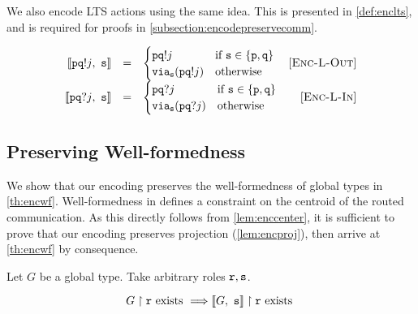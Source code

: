 We also encode LTS actions using the same idea. 
This is presented in \cref{def:enclts}, and is required for
proofs in \cref{subsection:encodepreservecomm}.

\begin{definition}

\doublespacing
\[
\begin{array}{rclr}
\llbracket {  {\mathtt{p}}  {\mathtt{q}} !{j} },~{\mathtt{s}} \rrbracket &= & \begin{cases}
{\mathtt{p}}{\mathtt{q}}!{j}
	& \text{if } {\mathtt{s}} \in \{ {\mathtt{p}}, {\mathtt{q}} \} \\
{\texttt{via}_{{\mathtt{s}}}({{\mathtt{p}}{\mathtt{q}}!{j}})}
	& \text{otherwise} \\
\end{cases} & [\textsc{Enc-L-Out}] \\
\llbracket {  {\mathtt{p}}  {\mathtt{q}} ?{j} },~{\mathtt{s}} \rrbracket &= & \begin{cases}
{\mathtt{p}}{\mathtt{q}}?{j}
	& \text{if } {\mathtt{s}} \in \{ {\mathtt{p}}, {\mathtt{q}} \} \\
{\texttt{via}_{{\mathtt{s}}}({{\mathtt{p}}{\mathtt{q}}?{j}})}
	& \text{otherwise} \\
\end{cases} & [\textsc{Enc-L-In}] \\
\end{array}
\]
\singlespacing

\label{def:enclts}
\end{definition}

\subsection{Preserving Well-formedness}
\label{subsection:encodepreservewf}

We show that our encoding preserves the well-formedness
of global types in \cref{th:encwf}.
Well-formedness in \newtheory defines a constraint
on the centroid of the routed communication.
As this directly follows from \cref{lem:enccenter},
it is sufficient to prove that our encoding preserves
projection (\cref{lem:encproj}), then arrive at \cref{th:encwf}
by consequence.

\begin{lemma}
Let $G$ be a global type.
Take arbitrary roles ${\mathtt{r}}, {\mathtt{s}}$.

\[
{G} \upharpoonright {\mathtt{r}} \text{ exists } 
	\Longrightarrow 
{  \llbracket {G},~ {\mathtt{s}}  \rrbracket  } \upharpoonright {\mathtt{r}} \text{ exists }
\]

\label{lem:encproj}
\end{lemma}

